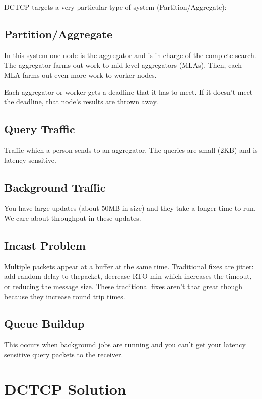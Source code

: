 \documentclass[psamsfonts]{amsart}
\begin{document}
DCTCP targets a very particular type of system (Partition/Aggregate):

\subsection{Partition/Aggregate}

In this system one node is the aggregator and is in charge of the complete search. The aggregator farms out work to mid level aggregators (MLAs). Then, each MLA farms out even more work to worker nodes.

Each aggregator or worker gets a deadline that it has to meet. If it doesn't meet the deadline, that node's results are thrown away.

\subsection{Query Traffic}

Traffic which a person sends to an aggregator. The queries are small (2KB) and is latency sensitive.

\subsection{Background Traffic}

You have large updates (about 50MB in size) and they take a longer time to run. We care about throughput in these updates.

\subsection{Incast Problem}

Multiple packets appear at a buffer at the same time. Traditional fixes are jitter: add random delay to thepacket, decrease RTO min which increases the timeout, or reducing the message size. These traditional fixes aren't that great though because they increase round trip times.

\subsection{Queue Buildup}

This occurs when background jobs are running and you can't get your latency sensitive query packets to the receiver.

\section{DCTCP Solution}
\end{document}
